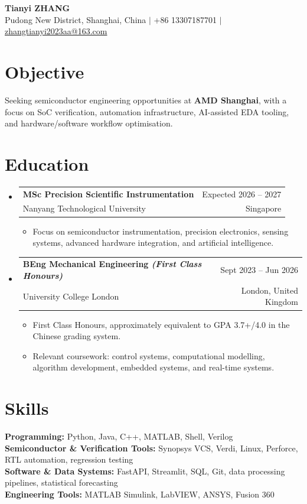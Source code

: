 \documentclass[a4paper,11pt]{article}
\makeatletter
\newcommand{\CVItem}[1]{
  \item \small{#1}
}
\newcommand{\CVSubheading}[4]{
  \vspace{-2pt}\item
    \begin{tabular*}{\textwidth}[t]{l@{\extracolsep{\fill}}r}
      \textbf{#1} & #2 \\
      \small#3 & \small #4 \\
    \end{tabular*}\vspace{-4pt}
}
\newcommand{\CVSubHeadingListStart}{
  \begin{itemize}[leftmargin=0cm, label={}, itemsep=3pt, topsep=2pt, parsep=0pt, partopsep=0pt]
}
\newcommand{\CVSubHeadingListEnd}{\end{itemize}}
\newcommand{\CVItemListStart}{
  \begin{itemize}[leftmargin=0.45cm, itemsep=2pt, topsep=2pt, parsep=0pt, partopsep=0pt]
}
\newcommand{\CVItemListEnd}{\end{itemize}}
\makeatother
\begin{document}

\begin{center}
  {\LARGE \textbf{Tianyi ZHANG}} \\ \vspace{2pt}
  \small Pudong New District, Shanghai, China $|$
  +86 13307187701 $|$
  \href{mailto:zhangtianyi2023aa@163.com}{zhangtianyi2023aa@163.com}
\end{center}


\section{Objective}
\small{
Seeking semiconductor engineering opportunities at \textbf{AMD Shanghai}, with a focus on SoC verification, automation infrastructure, AI-assisted EDA tooling, and hardware/software workflow optimisation.
}


\section{Education}
\CVSubHeadingListStart

\CVSubheading
{MSc Precision Scientific Instrumentation}
{Expected 2026 -- 2027}
{Nanyang Technological University}
{Singapore}
\CVItemListStart
  \CVItem{Focus on semiconductor instrumentation, precision electronics, sensing systems, advanced hardware integration, and artificial intelligence.}
\CVItemListEnd

\CVSubheading
{BEng Mechanical Engineering \emph{\small{(First Class Honours)}}}
{Sept 2023 -- Jun 2026}
{University College London}
{London, United Kingdom}
\CVItemListStart
  \CVItem{First Class Honours, approximately equivalent to GPA 3.7+/4.0 in the Chinese grading system.}
  \CVItem{Relevant coursework: control systems, computational modelling, algorithm development, embedded systems, and real-time systems.}
\CVItemListEnd

\CVSubHeadingListEnd


\section{Skills}
\small{
\textbf{Programming:} Python, Java, C++, MATLAB, Shell, Verilog \\[4pt]

\textbf{Semiconductor \& Verification Tools:} Synopsys VCS, Verdi, Linux, Perforce, RTL automation, regression testing \\[4pt]

\textbf{Software \& Data Systems:} FastAPI, Streamlit, SQL, Git, data processing pipelines, statistical forecasting \\[4pt]

\textbf{Engineering Tools:} MATLAB Simulink, LabVIEW, ANSYS, Fusion 360
}
\end{document}
